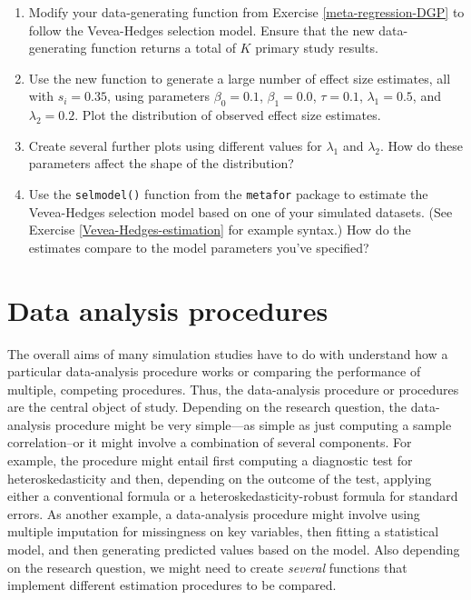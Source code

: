 \documentclass[
]{book}
\begin{document}
\begin{enumerate}
\def\labelenumi{\arabic{enumi}.}
\item
  Modify your data-generating function from Exercise \ref{meta-regression-DGP} to follow the Vevea-Hedges selection model. Ensure that the new data-generating function returns a total of \(K\) primary study results.
\item
  Use the new function to generate a large number of effect size estimates, all with \(s_i = 0.35\), using parameters \(\beta_0 = 0.1\), \(\beta_1 = 0.0\), \(\tau = 0.1\), \(\lambda_1 = 0.5\), and \(\lambda_2 = 0.2\). Plot the distribution of observed effect size estimates.
\item
  Create several further plots using different values for \(\lambda_1\) and \(\lambda_2\). How do these parameters affect the shape of the distribution?
\item
  Use the \texttt{selmodel()} function from the \texttt{metafor} package to estimate the Vevea-Hedges selection model based on one of your simulated datasets. (See Exercise \ref{Vevea-Hedges-estimation} for example syntax.) How do the estimates compare to the model parameters you've specified?
\end{enumerate}

\chapter{Data analysis procedures}\label{data-analysis-procedures}

The overall aims of many simulation studies have to do with understand how a particular data-analysis procedure works or comparing the performance of multiple, competing procedures.
Thus, the data-analysis procedure or procedures are the central object of study.
Depending on the research question, the data-analysis procedure might be very simple---as simple as just computing a sample correlation--or it might involve a combination of several components.
For example, the procedure might entail first computing a diagnostic test for heteroskedasticity and then, depending on the outcome of the test, applying either a conventional formula or a heteroskedasticity-robust formula for standard errors.
As another example, a data-analysis procedure might involve using multiple imputation for missingness on key variables, then fitting a statistical model, and then generating predicted values based on the model.
Also depending on the research question, we might need to create \emph{several} functions that implement different estimation procedures to be compared.
\end{document}

